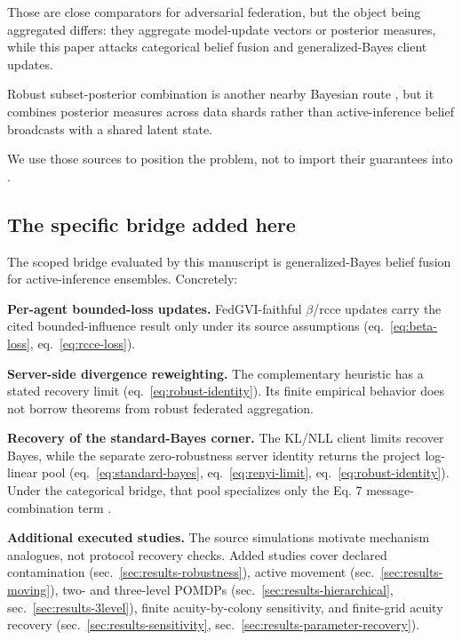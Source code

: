 \documentclass[
  english,
]{article}
\theoremstyle{plain}
\theoremstyle{definition}
\theoremstyle{remark}
\theoremstyle{definition}
\begin{document}
Those are close comparators for adversarial federation, but the object
being aggregated differs: they aggregate model-update vectors or
posterior measures, while this paper attacks categorical belief fusion
and generalized-Bayes client updates.

Robust subset-posterior combination is another nearby Bayesian route
\citep{minsker2017median}, but it combines posterior measures across
data shards rather than active-inference belief broadcasts with a shared
latent state.

We use those sources to position the problem, not to import their
guarantees into .

\subsection{The specific bridge added here}\label{sec:related-gap}

The scoped bridge evaluated by this manuscript is generalized-Bayes
belief fusion for active-inference ensembles. Concretely:

\textbf{Per-agent bounded-loss updates.} FedGVI-faithful \(\beta\)/rcce
updates carry the cited bounded-influence result only under its source
assumptions (eq.~\ref{eq:beta-loss}, eq.~\ref{eq:rcce-loss}).

\textbf{Server-side divergence reweighting.} The complementary heuristic
has a stated recovery limit (eq.~\ref{eq:robust-identity}). Its finite
empirical behavior does not borrow theorems from robust federated
aggregation.

\textbf{Recovery of the standard-Bayes corner.} The KL/NLL client limits
recover Bayes, while the separate zero-robustness server identity
returns the project log-linear pool (eq.~\ref{eq:standard-bayes},
eq.~\ref{eq:renyi-limit}, eq.~\ref{eq:robust-identity}). Under the
categorical bridge, that pool specializes only the Eq. 7
message-combination term \citep{friston2024federated}.

\textbf{Additional executed studies.} The source simulations motivate
mechanism analogues, not protocol recovery checks. Added studies cover
declared contamination (sec.~\ref{sec:results-robustness}), active
movement (sec.~\ref{sec:results-moving}), two- and three-level POMDPs
(sec.~\ref{sec:results-hierarchical}, sec.~\ref{sec:results-3level}),
finite acuity-by-colony sensitivity, and finite-grid acuity recovery
(sec.~\ref{sec:results-sensitivity},
sec.~\ref{sec:results-parameter-recovery}).
\end{document}
